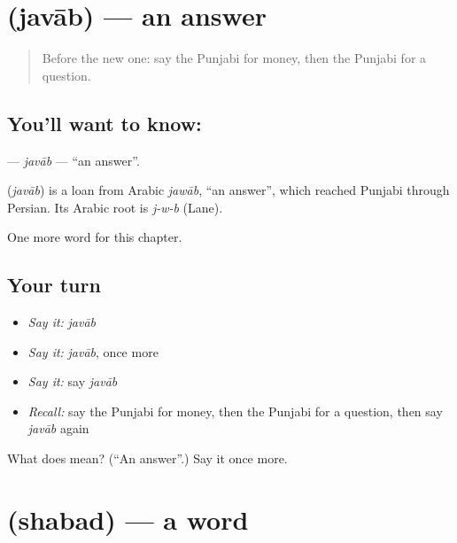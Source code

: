\section[\texorpdfstring{\pa{ਜਵਾਬ} (javāb)}{ਜਵਾਬ (javāb)}]{ (javāb) — an answer}

\label{lesson:PA-C72-javab}



\begin{quote}
Before the new one: say the Punjabi for money, then the Punjabi for a question.
\end{quote}

\subsection*{You'll want to know: }
\textbf{} — \emph{javāb} — \textquotedblleft{}an answer\textquotedblright{}.

\begin{cousinweb}
\textbf{} (\emph{javāb}) is a loan from Arabic \emph{jawāb}, \textquotedblleft{}an answer\textquotedblright{}, which reached Punjabi through Persian. Its Arabic root is \emph{j-w-b} (Lane).
\end{cousinweb}

\begin{grammarlens}[title={What you've built}]
One more word for this chapter.
\end{grammarlens}

\subsection*{Your turn}
\begin{itemize}
\raggedright
  \item \emph{Say it:} \emph{javāb}
  \item \emph{Say it:} \emph{javāb}, once more
  \item \emph{Say it:} say \emph{javāb}
  \item \emph{Recall:} say the Punjabi for money, then the Punjabi for a question, then say \emph{javāb} again
\end{itemize}

\begin{tcolorbox}[breakable,colback=teal!4,colframe=teal!35!black,title={Before you move on}]
What does  mean? (\textquotedblleft{}An answer\textquotedblright{}.) Say it once more.
\end{tcolorbox}
\section[\texorpdfstring{\pa{ਸ਼ਬਦ} (shabad)}{ਸ਼ਬਦ (shabad)}]{ (shabad) — a word}

